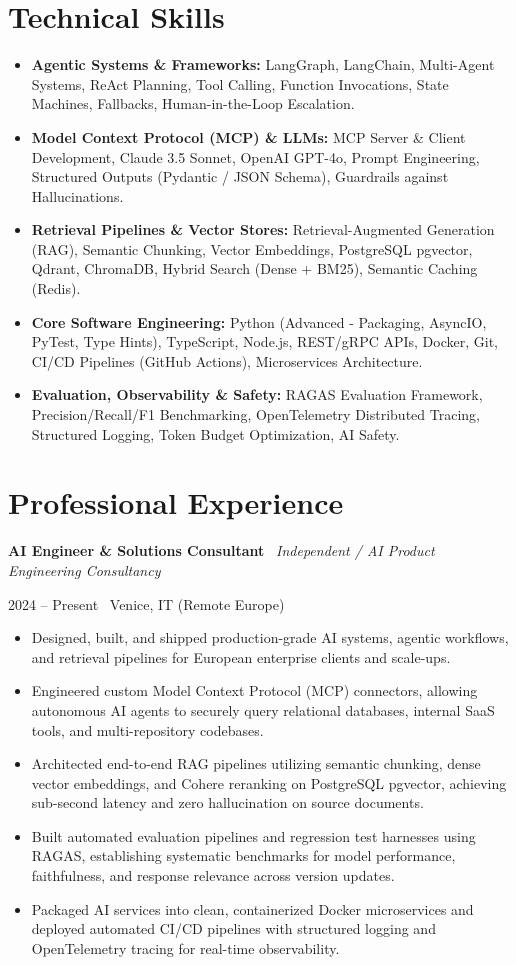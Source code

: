 \documentclass[a4paper,10pt]{article}
\newcommand{\role}[4]{%
  \vspace{2pt}\noindent
  \begin{minipage}[t]{0.70\textwidth}\raggedright\textbf{#1} \textbullet\ \textit{#3}\end{minipage}%
  \hfill
  \begin{minipage}[t]{0.28\textwidth}\raggedleft\footnotesize\color{gray}#2 \textbullet\ #4\end{minipage}%
  \vspace{1pt}%
}
\begin{document}
\section{Technical Skills}
\begin{itemize}[leftmargin=1.2em, itemsep=2pt]
  \item \textbf{Agentic Systems \& Frameworks:} LangGraph, LangChain, Multi-Agent Systems, ReAct Planning, Tool Calling, Function Invocations, State Machines, Fallbacks, Human-in-the-Loop Escalation.
  \item \textbf{Model Context Protocol (MCP) \& LLMs:} MCP Server \& Client Development, Claude 3.5 Sonnet, OpenAI GPT-4o, Prompt Engineering, Structured Outputs (Pydantic / JSON Schema), Guardrails against Hallucinations.
  \item \textbf{Retrieval Pipelines \& Vector Stores:} Retrieval-Augmented Generation (RAG), Semantic Chunking, Vector Embeddings, PostgreSQL pgvector, Qdrant, ChromaDB, Hybrid Search (Dense + BM25), Semantic Caching (Redis).
  \item \textbf{Core Software Engineering:} Python (Advanced - Packaging, AsyncIO, PyTest, Type Hints), TypeScript, Node.js, REST/gRPC APIs, Docker, Git, CI/CD Pipelines (GitHub Actions), Microservices Architecture.
  \item \textbf{Evaluation, Observability \& Safety:} RAGAS Evaluation Framework, Precision/Recall/F1 Benchmarking, OpenTelemetry Distributed Tracing, Structured Logging, Token Budget Optimization, AI Safety.
\end{itemize}

\section{Professional Experience}

\role{AI Engineer \& Solutions Consultant}{2024 -- Present}{Independent / AI Product Engineering Consultancy}{Venice, IT (Remote Europe)}
\begin{itemize}
  \item Designed, built, and shipped production-grade AI systems, agentic workflows, and retrieval pipelines for European enterprise clients and scale-ups.
  \item Engineered custom Model Context Protocol (MCP) connectors, allowing autonomous AI agents to securely query relational databases, internal SaaS tools, and multi-repository codebases.
  \item Architected end-to-end RAG pipelines utilizing semantic chunking, dense vector embeddings, and Cohere reranking on PostgreSQL pgvector, achieving sub-second latency and zero hallucination on source documents.
  \item Built automated evaluation pipelines and regression test harnesses using RAGAS, establishing systematic benchmarks for model performance, faithfulness, and response relevance across version updates.
  \item Packaged AI services into clean, containerized Docker microservices and deployed automated CI/CD pipelines with structured logging and OpenTelemetry tracing for real-time observability.
\end{itemize}
\end{document}
